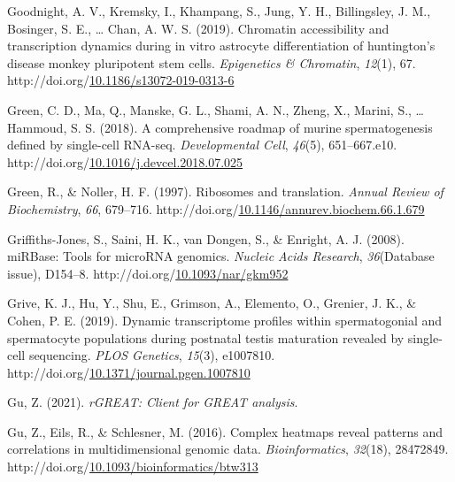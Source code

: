 \documentclass[12pt,twoside]{reedthesis}
\newlength{\cslhangindent}
\newenvironment{CSLReferences}[2] %
 {%
  \setlength{\parindent}{0pt}
  \ifodd #1 \everypar{\setlength{\hangindent}{\cslhangindent}}\ignorespaces\fi
  \ifnum #2 > 0
  \setlength{\parskip}{#2\baselineskip}
  \fi
 }%
 {}
\begin{document}
\begin{CSLReferences}{1}{0}
\leavevmode{}%
Goodnight, A. V., Kremsky, I., Khampang, S., Jung, Y. H., Billingsley, J. M., Bosinger, S. E., \ldots{} Chan, A. W. S. (2019). Chromatin accessibility and transcription dynamics during in vitro astrocyte differentiation of huntington's disease monkey pluripotent stem cells. \emph{Epigenetics \& Chromatin}, \emph{12}(1), 67. http://doi.org/\href{https://doi.org/10.1186/s13072-019-0313-6}{10.1186/s13072-019-0313-6}

\leavevmode{}%
Green, C. D., Ma, Q., Manske, G. L., Shami, A. N., Zheng, X., Marini, S., \ldots{} Hammoud, S. S. (2018). A comprehensive roadmap of murine spermatogenesis defined by single-cell RNA-seq. \emph{Developmental Cell}, \emph{46}(5), 651--667.e10. http://doi.org/\href{https://doi.org/10.1016/j.devcel.2018.07.025}{10.1016/j.devcel.2018.07.025}

\leavevmode{}%
Green, R., \& Noller, H. F. (1997). Ribosomes and translation. \emph{Annual Review of Biochemistry}, \emph{66}, 679--716. http://doi.org/\href{https://doi.org/10.1146/annurev.biochem.66.1.679}{10.1146/annurev.biochem.66.1.679}

\leavevmode{}%
Griffiths-Jones, S., Saini, H. K., van Dongen, S., \& Enright, A. J. (2008). miRBase: Tools for microRNA genomics. \emph{Nucleic Acids Research}, \emph{36}(Database issue), D154--8. http://doi.org/\href{https://doi.org/10.1093/nar/gkm952}{10.1093/nar/gkm952}

\leavevmode{}%
Grive, K. J., Hu, Y., Shu, E., Grimson, A., Elemento, O., Grenier, J. K., \& Cohen, P. E. (2019). Dynamic transcriptome profiles within spermatogonial and spermatocyte populations during postnatal testis maturation revealed by single-cell sequencing. \emph{PLOS Genetics}, \emph{15}(3), e1007810. http://doi.org/\href{https://doi.org/10.1371/journal.pgen.1007810}{10.1371/journal.pgen.1007810}

\leavevmode{}%
Gu, Z. (2021). \emph{rGREAT: Client for GREAT analysis}.

\leavevmode{}%
Gu, Z., Eils, R., \& Schlesner, M. (2016). Complex heatmaps reveal patterns and correlations in multidimensional genomic data. \emph{Bioinformatics}, \emph{32}(18), 28472849. http://doi.org/\href{https://doi.org/10.1093/bioinformatics/btw313}{10.1093/bioinformatics/btw313}


\end{CSLReferences}
\end{document}
